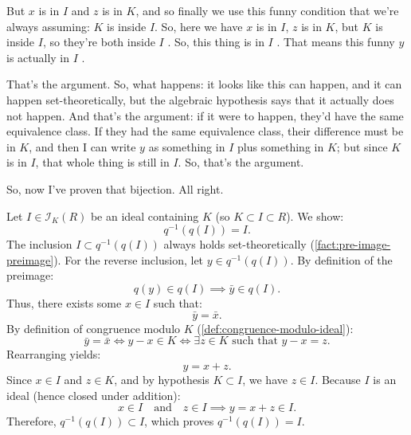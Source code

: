 \begin{proofWrapper}
\begin{speech}[00:34:49 - 00:36:36]
But $x$ is in $I$ and $z$ is in $K$, and so finally we use this funny condition that we're always assuming: $K$ is inside $I$. So, here we have $x$ is in $I$, $z$ is in $K$, but $K$ is inside $I$, so they're both inside $I$ . So, this thing is in $I$ . That means this funny $y$ is actually in $I$ .

That's the argument. So, what happens: it looks like this can happen, and it can happen set-theoretically, but the algebraic hypothesis says that it actually does not happen. And that's the argument: if it were to happen, they'd have the same equivalence class. If they had the same equivalence class, their difference must be in $K$, and then I can write $y$ as something in $I$ plus something in $K$; but since $K$ is in $I$, that whole thing is still in $I$. So, that's the argument.

So, now I've proven that bijection. All right.
\end{speech}

\begin{content}[Bijective Property Part (B): \texorpdfstring{$q^{-1}(q(I)) = I$}{q^{-1}(q(I)) = I}]
Let $I \in \mathscr{I}_K(R)$ be an ideal containing $K$ (so $K \subset I \subset R$). We show:
\begin{equation}\label{eq:composition-step-b}
q^{-1}(q(I)) = I.
\end{equation}
The inclusion $I \subset q^{-1}(q(I))$ always holds set-theoretically (\cref{fact:pre-image-preimage}).
For the reverse inclusion, let $y \in q^{-1}(q(I))$.
By definition of the preimage:
\[
q(y) \in q(I) \implies \bar{y} \in q(I).
\]
Thus, there exists some $x \in I$ such that:
\[
\bar{y} = \bar{x}.
\]
By definition of congruence modulo $K$ (\cref{def:congruence-modulo-ideal}):
\[
\bar{y} = \bar{x} \iff y - x \in K \iff \exists z \in K \text{ such that } y - x = z.
\]
Rearranging yields:
\[
y = x + z.
\]
Since $x \in I$ and $z \in K$, and by hypothesis $K \subset I$, we have $z \in I$. Because $I$ is an ideal (hence closed under addition):
\[
x \in I \quad \text{and} \quad z \in I \implies y = x + z \in I.
\]
Therefore, $q^{-1}(q(I)) \subset I$, which proves $q^{-1}(q(I)) = I$.


\end{content}
\end{proofWrapper}
